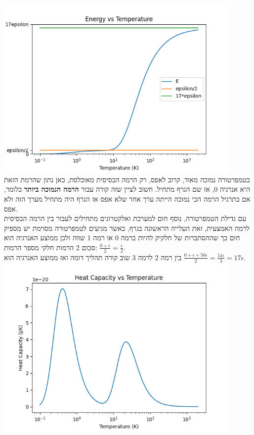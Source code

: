 \documentclass{article}
\begin{document}
\begin{Answer}
\includegraphics[width=0.9\textwidth]{image/Q3energy.png}\\
בטמפרטורה נמוכה מאוד, קרוב לאפס, רק הרמה הבסיסית מאוכלסת, כאן נתון שהרמת הזאת היא אנרגיה 0, אז שם הגרף מתחיל. חשוב לציין שזה קורה עבור \textbf{הרמה הנמוכה ביותר} כלומר, אם בתרגיל הרמה הכי נמוכה הייתה ערך אחר שלא אפס אז הגרף היה מתחיל מערך הזה ולא אפס.\\
עם גדילת הטמפרטורה, נוסף חום למערכת ואלקטרונים מתחילים לעבור בין הרמה הבסיסית לרמה האמצעית, זאת העלייה הראשונה בגרף, כאשר מגיעים לטמפרטורה מסוימת יש מספיק חום כך שההסתברות של חלקיק להיות ברמה 0 או רמה 1 שווה ולכן ממוצע האנרגיה הוא סכום 2 הרמות חלקי מספר הרמות: $\frac{0+\epsilon}{2}=\frac{\epsilon}{2}$.\\
בין רמה 2 לרמה 3 שוב קורה תהליך דומה ואז ממוצע האנרגיה הוא $\frac{0+\epsilon+50\epsilon}{2}=\frac{51\epsilon}{3} = 17 \epsilon$.\\
\includegraphics[width=0.9\textwidth]{image/Q3HeatCapacity.png}\\

\end{Answer}
\end{document}
